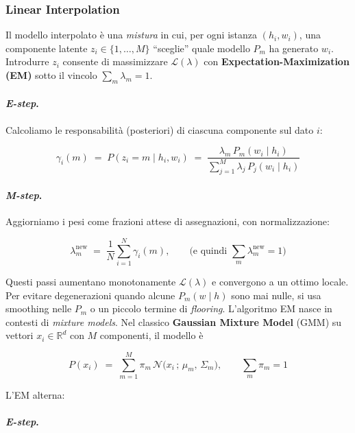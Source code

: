         \subsubsection{Linear Interpolation}
        
            Il modello interpolato è una \textit{mistura} in cui, per ogni istanza $(h_i,w_i)$, una componente latente $z_i\in\{1,\dots,M\}$ ``sceglie'' quale modello $P_m$ ha generato $w_i$. Introdurre $z_i$ consente di massimizzare $\mathcal{L}(\lambda)$ con \textbf{Expectation-Maximization (EM)} sotto il vincolo $\sum_m \lambda_m=1$.
            
            
            \paragraph{\textit{E-step}.} Calcoliamo le responsabilità (posteriori) di ciascuna componente sul dato $i$:
            
            $$
            \gamma_i(m) \;=\; P(z_i{=}m\mid h_i,w_i)
            \;=\; \frac{\lambda_m\, P_m(w_i\mid h_i)}{\sum_{j=1}^{M} \lambda_j\, P_j(w_i\mid h_i)}
            $$
            
            \paragraph{\textit{M-step}.} Aggiorniamo i pesi come frazioni attese di assegnazioni, con normalizzazione:
    
            $$
            \lambda_m^{\text{new}} \;=\; \frac{1}{N} \sum_{i=1}^{N} \gamma_i(m),
            \qquad \text{(e quindi }\sum_m \lambda_m^{\text{new}}=1\text{)}
            $$
            
            Questi passi aumentano monotonamente $\mathcal{L}(\lambda)$ e convergono a un ottimo locale. Per evitare degenerazioni quando alcune $P_m(w\mid h)$ sono mai nulle, si usa smoothing nelle $P_m$ o un piccolo termine di \textit{flooring}. L’algoritmo EM nasce in contesti di \textit{mixture models}. Nel classico \textbf{Gaussian Mixture Model} (GMM) su vettori $x_i\in\mathbb{R}^d$ con $M$ componenti, il modello è
            
            $$
            P(x_i) \;=\; \sum_{m=1}^{M} \pi_m\, \mathcal{N}\big(x_i\,;\,\mu_m,\,\Sigma_m\big),\qquad \sum_m \pi_m=1
            $$
            
            L’EM alterna: 
            \paragraph{\textit{E-step}.}
            
